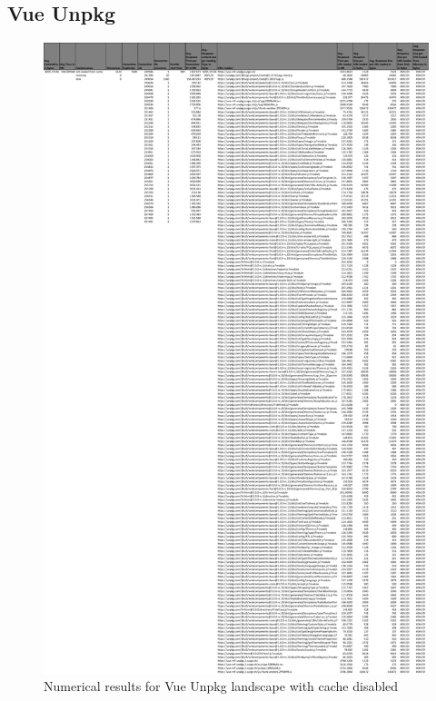 \subsection{Vue Unpkg}

\begin{figure}[!h]
	\centering
	\begin{adjustbox}{width=\textwidth,totalheight=0.9\textheight}
		\includegraphics[angle=90]{Figures/vue_unpkg_allhar.pdf}
	\end{adjustbox}
	\caption{Numerical results for Vue Unpkg landscape with cache disabled}
	\label{fig:appendix_1_16}
\end{figure}
